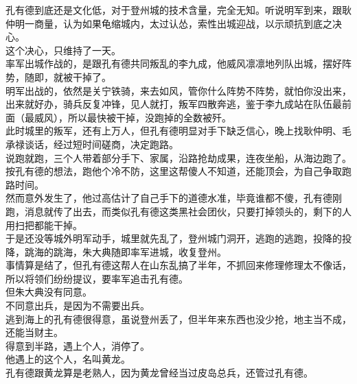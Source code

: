 \begin{multicols}{\theparacolNo}
孔有德到底还是文化低，对于登州城的技术含量，完全无知。听说明军到来，跟耿仲明一商量，认为如果龟缩城内，太过认怂，索性出城迎战，以示顽抗到底之决心。\\

这个决心，只维持了一天。\\

率军出城作战的，是跟孔有德共同叛乱的李九成，他威风凛凛地列队出城，摆好阵势，随即，就被干掉了。\\

明军出战的，依然是关宁铁骑，来去如风，管你什么阵势不阵势，就怕你没出来，出来就好办，骑兵反复冲锋，见人就打，叛军四散奔逃，鉴于李九成站在队伍最前面（最威风），所以最快被干掉，没跑掉的全数被歼。\\

此时城里的叛军，还有上万人，但孔有德明显对手下缺乏信心，晚上找耿仲明、毛承禄谈话，经过短时间磋商，决定跑路。\\

说跑就跑，三个人带着部分手下、家属，沿路抢劫成果，连夜坐船，从海边跑了。\\

按孔有德的想法，跑他个冷不防，这里这帮傻人不知道，还能顶会，为自己争取跑路时间。\\

然而意外发生了，他过高估计了自己手下的道德水准，毕竟谁都不傻，孔有德刚跑，消息就传了出去，而类似孔有德这类黑社会团伙，只要打掉领头的，剩下的人用扫把都能干掉。\\

于是还没等城外明军动手，城里就先乱了，登州城门洞开，逃跑的逃跑，投降的投降，跳海的跳海，朱大典随即率军进城，收复登州。\\

事情算是结了，但孔有德这帮人在山东乱搞了半年，不抓回来修理修理太不像话，所以将领们纷纷提议，要率军追击孔有德。\\

但朱大典没有同意。\\

不同意出兵，是因为不需要出兵。\\

逃到海上的孔有德很得意，虽说登州丢了，但半年来东西也没少抢，地主当不成，还能当财主。\\

得意到半路，遇上个人，消停了。\\

他遇上的这个人，名叫黄龙。\\

孔有德跟黄龙算是老熟人，因为黄龙曾经当过皮岛总兵，还管过孔有德。\\


\end{multicols}
